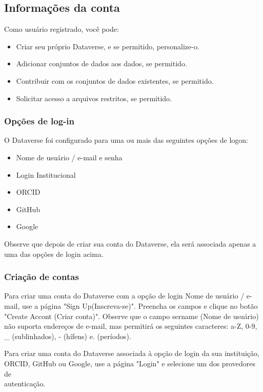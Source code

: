 \documentclass[12pt,hidelinks]{article}
\begin{document}
	\subsection{Informações da conta}
	
\qquad Como usuário registrado, você pode:

\begin{itemize}
    \item Criar seu próprio Dataverse, e se permitido, personalize-o.
    \item Adicionar conjuntos de dados aos dados, se permitido.
    \item Contribuir com os conjuntos de dados existentes, se permitido.
    \item Solicitar acesso a arquivos restritos, se permitido.
\end{itemize}
     	
        \subsubsection{Opções de log-in}
        
\qquad O Dataverse foi configurado para uma ou mais das seguintes opções de logon:
        
\begin{itemize}
\item Nome de usuário / e-mail e senha
\item Login Institucional
\item ORCID
\item GitHub
\item Google
\end{itemize}

Observe que depois de criar sua conta do Dataverse, ela será associada apenas a uma das opções de login acima.

        \subsubsection{Criação de contas}
        
\qquad Para criar uma conta do Dataverse com a opção de login Nome de usuário / e-mail, use a página "Sign Up(Inscreva-se)". Preencha os campos e clique no botão "Create Accont (Criar conta)". Observe que o campo sername (Nome de usuário) não suporta endereços de e-mail, mas permitirá os seguintes caracteres: a-Z, 0-9, \_ (sublinhados), - (hífens) e. (períodos).

Para criar uma conta do Dataverse associada à opção de login da sua instituição, ORCID, GitHub ou Google, use a página "Login" e selecione um dos provedores de \\autenticação.
\end{document}
